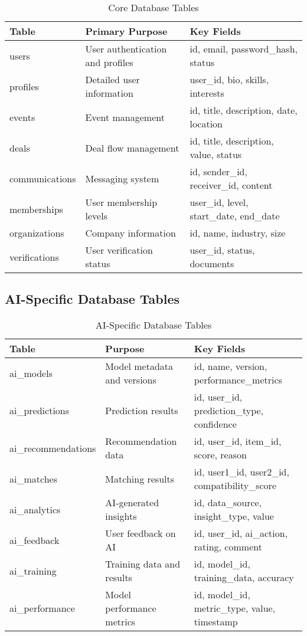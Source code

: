 \begin{table}[h]
\centering
\begin{tabular}{|l|l|l|}
\hline
\textbf{Table} & \textbf{Primary Purpose} & \textbf{Key Fields} \\
\hline
users & User authentication and profiles & id, email, password\_hash, status \\
profiles & Detailed user information & user\_id, bio, skills, interests \\
events & Event management & id, title, description, date, location \\
deals & Deal flow management & id, title, description, value, status \\
communications & Messaging system & id, sender\_id, receiver\_id, content \\
memberships & User membership levels & user\_id, level, start\_date, end\_date \\
organizations & Company information & id, name, industry, size \\
verifications & User verification status & user\_id, status, documents \\
\hline
\end{tabular}
\caption{Core Database Tables}
\label{tab:core-database-tables}
\end{table}

\subsection{AI-Specific Database Tables}

\begin{table}[h]
\centering
\begin{tabular}{|l|l|l|}
\hline
\textbf{Table} & \textbf{Purpose} & \textbf{Key Fields} \\
\hline
ai\_models & Model metadata and versions & id, name, version, performance\_metrics \\
ai\_predictions & Prediction results & id, user\_id, prediction\_type, confidence \\
ai\_recommendations & Recommendation data & id, user\_id, item\_id, score, reason \\
ai\_matches & Matching results & id, user1\_id, user2\_id, compatibility\_score \\
ai\_analytics & AI-generated insights & id, data\_source, insight\_type, value \\
ai\_feedback & User feedback on AI & id, user\_id, ai\_action, rating, comment \\
ai\_training & Training data and results & id, model\_id, training\_data, accuracy \\
ai\_performance & Model performance metrics & id, model\_id, metric\_type, value, timestamp \\
\hline
\end{tabular}
\caption{AI-Specific Database Tables}
\label{tab:ai-database-tables}
\end{table}


